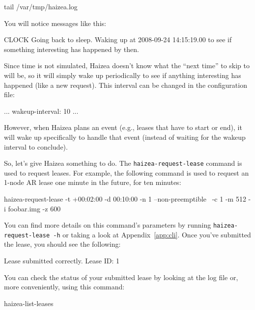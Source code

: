 \begin{shellverbatim}
tail /var/tmp/haizea.log
\end{shellverbatim}

You will notice messages like this:

\begin{wideshellverbatim}
[2008-09-24 14:14:18.58] CLOCK   Going back to sleep. 
                                 Waking up at 2008-09-24 14:15:19.00 
                                 to see if something interesting has 
                                 happened by then.
\end{wideshellverbatim}

Since time is not simulated, Haizea doesn't know what the ``next time'' to skip to will be, so it will simply wake up periodically to see if anything interesting has happened (like a new request). This interval can be changed in the configuration file:

\begin{wideshellverbatim}
[simulation]
...
wakeup-interval: 10
...
\end{wideshellverbatim}

However, when Haizea plans an event (e.g., leases that have to start or end), it will wake up specifically to handle that event (instead of waiting for the wakeup interval to conclude).

So, let's give Haizea something to do. The \texttt{haizea-request-lease} command is used to request leases. For example, the following command is used to request an 1-node AR lease one minute in the future, for ten minutes:

\begin{wideshellverbatim}
haizea-request-lease -t +00:02:00 -d 00:10:00 -n 1 --non-preemptible \
                     -c 1 -m 512 -i foobar.img -z 600 
\end{wideshellverbatim}

You can find more details on this command's parameters by running \texttt{haizea-request-lease -h} or taking a look at Appendix~\ref{app:cli}. Once you've submitted the lease, you should see the following:

\begin{wideshellverbatim}
Lease submitted correctly.
Lease ID: 1
\end{wideshellverbatim}

You can check the status of your submitted lease by looking at the log file or, more conveniently, using this command:

\begin{shellverbatim}
haizea-list-leases
\end{shellverbatim}

